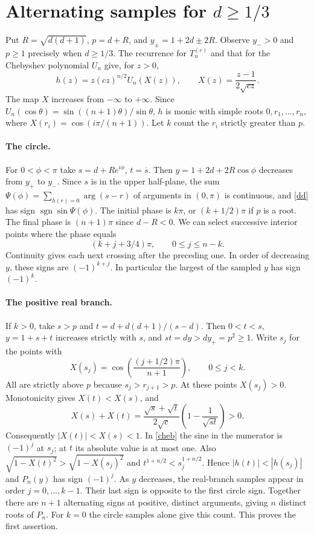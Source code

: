 \documentclass[11pt]{article}
\begin{document}
\section{Alternating samples for \texorpdfstring{$d\ge 1/3$}{d at least 1/3}}
Put $R=\sqrt{d(d+1)}$, $p=d+R$, and $y_\pm=1+2d\pm2R$. Observe $y_->0$ and $p\ge1$ precisely when $d\ge1/3$. The recurrence for $T_n^{(c)}$ and that for the Chebyshev polynomial $U_n$ give, for $z>0$,
\begin{equation}\label{cheb}
 h(z)= z(cz)^{n/2}U_n(X(z)),\qquad X(z)=\frac{z-1}{2\sqrt{cz}}.
\end{equation}
The map $X$ increases from $-\infty$ to $+\infty$. Since $U_n(\cos\theta)=\sin((n+1)\theta)/\sin\theta$, $h$ is monic with simple roots $0,r_1,\ldots,r_n$, where $X(r_i)=\cos(i\pi/(n+1))$. Let $k$ count the $r_i$ strictly greater than $p$.

\paragraph{The circle.} For $0<\phi<\pi$ take $s=d+Re^{i\phi}$, $t=\overline{s}$. Then $y=1+2d+2R\cos\phi$ decreases from $y_+$ to $y_-$. Since $s$ is in the upper half-plane, the sum $\Psi(\phi)=\sum_{h(r)=0}\arg(s-r)$ of arguments in $(0,\pi)$ is continuous, and \eqref{dd} has sign $\operatorname{sgn}\sin\Psi(\phi)$. The initial phase is $k\pi$, or $(k+1/2)\pi$ if $p$ is a root. The final phase is $(n+1)\pi$ since $d-R<0$. We can select successive interior points where the phase equals
\[
 (k+j+3/4)\pi,\qquad 0\le j\le n-k.
\]
Continuity gives each next crossing after the preceding one. In order of decreasing $y$, these signs are $(-1)^{k+j}$. In particular the largest of the sampled $y$ has sign $(-1)^k$.

\paragraph{The positive real branch.} If $k>0$, take $s>p$ and $t=d+d(d+1)/(s-d)$. Then $0<t<s$, $y=1+s+t$ increases strictly with $s$, and $st=dy>dy_+=p^2\ge1$. Write $s_j$ for the points with
\[
 X(s_j)=\cos\!\left(\frac{(j+1/2)\pi}{n+1}\right),\qquad 0\le j<k.
\]
All are strictly above $p$ because $s_j>r_{j+1}>p$. At these points $X(s_j)>0$. Monotonicity gives $X(t)<X(s)$, and
\[
 X(s)+X(t)=\frac{\sqrt{s}+\sqrt{t}}{2\sqrt c}\left(1-\frac1{\sqrt{st}}\right)>0.
\]
Consequently $|X(t)|<X(s)<1$. In \eqref{cheb} the sine in the numerator is $(-1)^j$ at $s_j$; at $t$ its absolute value is at most one. Also $\sqrt{1-X(t)^2}>\sqrt{1-X(s_j)^2}$ and $t^{1+n/2}<s_j^{1+n/2}$. Hence $|h(t)|<|h(s_j)|$ and $P_n(y)$ has sign $(-1)^j$. As $y$ decreases, the real-branch samples appear in order $j=0,\ldots,k-1$. Their last sign is opposite to the first circle sign. Together there are $n+1$ alternating signs at positive, distinct arguments, giving $n$ distinct roots of $P_n$. For $k=0$ the circle samples alone give this count. This proves the first assertion.
\end{document}
